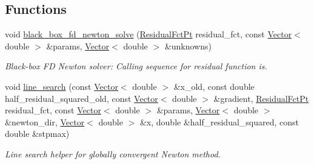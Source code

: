 \subsection*{Functions}
\begin{DoxyCompactItemize}
\item 
void \hyperlink{namespaceoomph_1_1BlackBoxFDNewtonSolver_ad3ba3031554be43788d296a7a4dddd67}{black\+\_\+box\+\_\+fd\+\_\+newton\+\_\+solve} (\hyperlink{namespaceoomph_1_1BlackBoxFDNewtonSolver_a0b45d0bd1b7ae8ff5c24715b6118d1fd}{Residual\+Fct\+Pt} residual\+\_\+fct, const \hyperlink{classoomph_1_1Vector}{Vector}$<$ double $>$ \&params, \hyperlink{classoomph_1_1Vector}{Vector}$<$ double $>$ \&unknowns)
\begin{DoxyCompactList}\small\item\em Black-\/box FD Newton solver\+: Calling sequence for residual function is. \end{DoxyCompactList}\item 
void \hyperlink{namespaceoomph_1_1BlackBoxFDNewtonSolver_a4a1361a9b08163b59fe82b3042b0f887}{line\+\_\+search} (const \hyperlink{classoomph_1_1Vector}{Vector}$<$ double $>$ \&x\+\_\+old, const double half\+\_\+residual\+\_\+squared\+\_\+old, const \hyperlink{classoomph_1_1Vector}{Vector}$<$ double $>$ \&gradient, \hyperlink{namespaceoomph_1_1BlackBoxFDNewtonSolver_a0b45d0bd1b7ae8ff5c24715b6118d1fd}{Residual\+Fct\+Pt} residual\+\_\+fct, const \hyperlink{classoomph_1_1Vector}{Vector}$<$ double $>$ \&params, \hyperlink{classoomph_1_1Vector}{Vector}$<$ double $>$ \&newton\+\_\+dir, \hyperlink{classoomph_1_1Vector}{Vector}$<$ double $>$ \&x, double \&half\+\_\+residual\+\_\+squared, const double \&stpmax)
\begin{DoxyCompactList}\small\item\em Line search helper for globally convergent Newton method. \end{DoxyCompactList}\end{DoxyCompactItemize}

